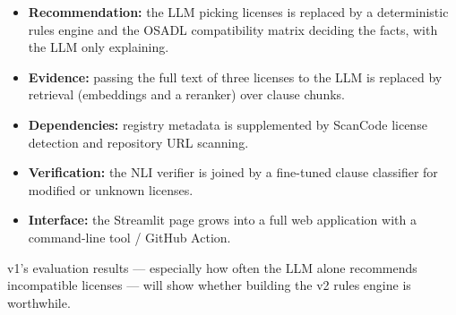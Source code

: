 \documentclass[11pt]{article}
\begin{document}
\begin{itemize}
  \item \textbf{Recommendation:} the LLM picking licenses is replaced by a deterministic rules engine and the OSADL compatibility matrix deciding the facts, with the LLM only explaining.
  \item \textbf{Evidence:} passing the full text of three licenses to the LLM is replaced by retrieval (embeddings and a reranker) over clause chunks.
  \item \textbf{Dependencies:} registry metadata is supplemented by ScanCode license detection and repository URL scanning.
  \item \textbf{Verification:} the NLI verifier is joined by a fine-tuned clause classifier for modified or unknown licenses.
  \item \textbf{Interface:} the Streamlit page grows into a full web application with a command-line tool / GitHub Action.
\end{itemize}

v1's evaluation results --- especially how often the LLM alone recommends incompatible licenses --- will show whether building the v2 rules engine is worthwhile.
\end{document}
